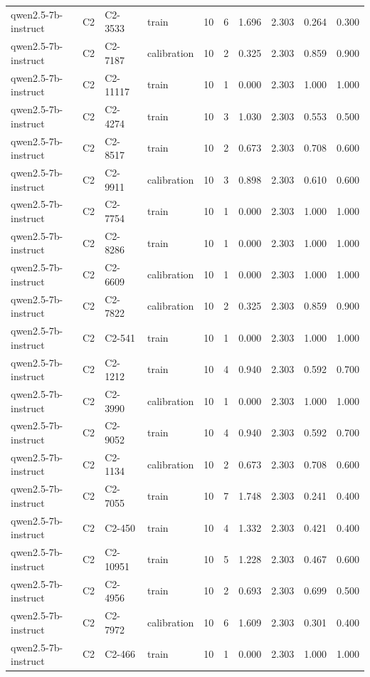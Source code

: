 \begin{table}
\begin{tabular}{llllrrrrrr}
qwen2.5-7b-instruct & C2 & C2-3533 & train & 10 & 6 & 1.696 & 2.303 & 0.264 & 0.300 \\
qwen2.5-7b-instruct & C2 & C2-7187 & calibration & 10 & 2 & 0.325 & 2.303 & 0.859 & 0.900 \\
qwen2.5-7b-instruct & C2 & C2-11117 & train & 10 & 1 & 0.000 & 2.303 & 1.000 & 1.000 \\
qwen2.5-7b-instruct & C2 & C2-4274 & train & 10 & 3 & 1.030 & 2.303 & 0.553 & 0.500 \\
qwen2.5-7b-instruct & C2 & C2-8517 & train & 10 & 2 & 0.673 & 2.303 & 0.708 & 0.600 \\
qwen2.5-7b-instruct & C2 & C2-9911 & calibration & 10 & 3 & 0.898 & 2.303 & 0.610 & 0.600 \\
qwen2.5-7b-instruct & C2 & C2-7754 & train & 10 & 1 & 0.000 & 2.303 & 1.000 & 1.000 \\
qwen2.5-7b-instruct & C2 & C2-8286 & train & 10 & 1 & 0.000 & 2.303 & 1.000 & 1.000 \\
qwen2.5-7b-instruct & C2 & C2-6609 & calibration & 10 & 1 & 0.000 & 2.303 & 1.000 & 1.000 \\
qwen2.5-7b-instruct & C2 & C2-7822 & calibration & 10 & 2 & 0.325 & 2.303 & 0.859 & 0.900 \\
qwen2.5-7b-instruct & C2 & C2-541 & train & 10 & 1 & 0.000 & 2.303 & 1.000 & 1.000 \\
qwen2.5-7b-instruct & C2 & C2-1212 & train & 10 & 4 & 0.940 & 2.303 & 0.592 & 0.700 \\
qwen2.5-7b-instruct & C2 & C2-3990 & calibration & 10 & 1 & 0.000 & 2.303 & 1.000 & 1.000 \\
qwen2.5-7b-instruct & C2 & C2-9052 & train & 10 & 4 & 0.940 & 2.303 & 0.592 & 0.700 \\
qwen2.5-7b-instruct & C2 & C2-1134 & calibration & 10 & 2 & 0.673 & 2.303 & 0.708 & 0.600 \\
qwen2.5-7b-instruct & C2 & C2-7055 & train & 10 & 7 & 1.748 & 2.303 & 0.241 & 0.400 \\
qwen2.5-7b-instruct & C2 & C2-450 & train & 10 & 4 & 1.332 & 2.303 & 0.421 & 0.400 \\
qwen2.5-7b-instruct & C2 & C2-10951 & train & 10 & 5 & 1.228 & 2.303 & 0.467 & 0.600 \\
qwen2.5-7b-instruct & C2 & C2-4956 & train & 10 & 2 & 0.693 & 2.303 & 0.699 & 0.500 \\
qwen2.5-7b-instruct & C2 & C2-7972 & calibration & 10 & 6 & 1.609 & 2.303 & 0.301 & 0.400 \\
qwen2.5-7b-instruct & C2 & C2-466 & train & 10 & 1 & 0.000 & 2.303 & 1.000 & 1.000 \\

\end{tabular}
\end{table}
